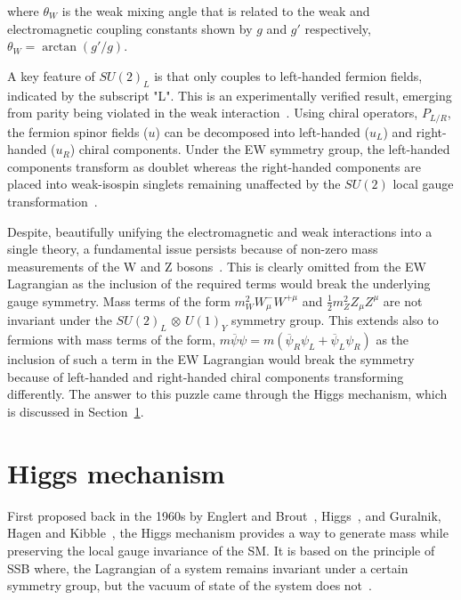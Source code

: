 where $\theta_{W}$ is the weak mixing angle that is related to the weak and electromagnetic coupling constants shown by $g$ and $g'$ respectively, $\theta_{W} = \arctan(g'/g)$.

A key feature of $SU(2)_L$ is that only couples to left-handed fermion fields, indicated by the subscript "L". This is an experimentally verified result, emerging from parity being violated in the weak interaction~\cite{ParityViolation}. Using chiral operators, $P_{L/R}$, the fermion spinor fields ($u$) can be decomposed into left-handed ($u_{L}$) and right-handed ($u_{R}$) chiral components. Under the EW symmetry group, the left-handed components transform as doublet whereas the right-handed components are placed into weak-isospin singlets remaining unaffected by the $SU(2)$ local gauge transformation~\cite{Parity_LHanded}.

Despite, beautifully unifying the electromagnetic and weak interactions into a single theory, a fundamental issue persists because of non-zero mass measurements of the W and Z bosons~\cite{W_Z_MassMeasurements_1,W_Z_MassMeasurements_2}. This is clearly omitted from the EW Lagrangian as the inclusion of the required terms would break the underlying gauge symmetry. Mass terms of the form ${m_{W}^2 W_{\mu}^{-} W^{+\mu}}$ and $\frac{1}{2} m_{Z}^{2} Z_{\mu} Z^{\mu}$ are not invariant under the $SU(2)_{L}$ $\otimes$ $U(1)_{Y}$ symmetry group. This extends also to fermions with mass terms of the form, $m\overline{\psi}\psi = m(\overline{\psi}_{R}\psi_{L} + \overline{\psi}_{L}\psi_{R})$ as the inclusion of such a term in the EW Lagrangian would break the symmetry because of left-handed and right-handed chiral components transforming differently. The answer to this puzzle came through the Higgs mechanism, which is discussed in Section~\ref{Section:Introduction_HiggsMechanism}.

\section{Higgs mechanism}
\label{Section:Introduction_HiggsMechanism}
First proposed back in the 1960s by Englert and Brout~\cite{Englert_Brout}, Higgs~\cite{Higgs_2}, and Guralnik, Hagen and Kibble~\cite{Guralnik_Hagen_Kibble,Kibble_1}, the Higgs mechanism provides a way to generate mass while preserving the local gauge invariance of the SM. It is based on the principle of \ac{SSB} where, the Lagrangian of a system remains invariant under a certain symmetry group, but the vacuum of state of the system does not~\cite{SSB_Definition}. 

